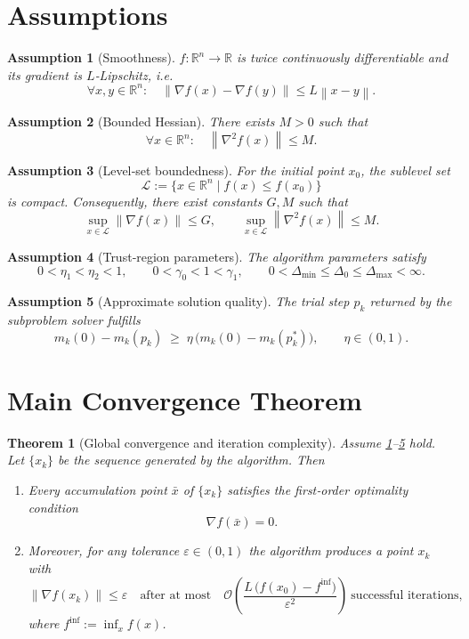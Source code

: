 \documentclass{article}
\newtheorem{theorem}{Theorem}
\newtheorem{assumption}{Assumption}
\newcommand{\norm}[1]{\left\lVert#1\right\rVert}
\newcommand{\RR}{\mathbb{R}}
\begin{document}
\section*{Assumptions}
\begin{assumption}[Smoothness]\label{as:smooth}
$f:\RR^{n}\rightarrow\RR$ is twice continuously differentiable and its gradient is $L$‑Lipschitz, i.e.
\[
\forall x,y\in\RR^{n}:\quad 
\norm{\nabla f(x)-\nabla f(y)}\le L\norm{x-y}.
\tag{A1}
\]
\end{assumption}
\begin{assumption}[Bounded Hessian]\label{as:hessian}
There exists $M>0$ such that
\[
\forall x\in\RR^{n}:\quad 
\norm{\nabla^{2}f(x)}\le M.
\tag{A2}
\]
\end{assumption}
\begin{assumption}[Level‑set boundedness]\label{as:level}
For the initial point $x_{0}$, the sublevel set
\[
\mathcal{L}:=\{x\in\RR^{n}\mid f(x)\le f(x_{0})\}
\]
is compact. Consequently, there exist constants $G,M$ such that
\[
\sup_{x\in\mathcal{L}}\norm{\nabla f(x)}\le G,\qquad
\sup_{x\in\mathcal{L}}\norm{\nabla^{2}f(x)}\le M.
\tag{A3}
\]
\end{assumption}
\begin{assumption}[Trust‑region parameters]\label{as:params}
The algorithm parameters satisfy
\[
0<\eta_{1}<\eta_{2}<1,\qquad
0<\gamma_{0}<1<\gamma_{1},\qquad
0<\Delta_{\min}\le\Delta_{0}\le\Delta_{\max}<\infty .
\tag{A4}
\]
\end{assumption}
\begin{assumption}[Approximate solution quality]\label{as:approx}
The trial step $p_{k}$ returned by the subproblem solver fulfills
\[
m_{k}(0)-m_{k}(p_{k})\;\ge\;\eta\,
\bigl(m_{k}(0)-m_{k}(p_{k}^{*})\bigr),
\qquad \eta\in(0,1).
\tag{A5}
\]
\end{assumption}

\section*{Main Convergence Theorem}
\begin{theorem}[Global convergence and iteration complexity]\label{thm:main}
Assume \ref{as:smooth}–\ref{as:approx} hold. Let $\{x_{k}\}$ be the sequence generated by the algorithm. Then
\begin{enumerate}[label=(\roman*)]
\item Every accumulation point $\bar x$ of $\{x_{k}\}$ satisfies the first‑order optimality condition
\[
\nabla f(\bar x)=0 .
\]
\item Moreover, for any tolerance $\varepsilon\in(0,1)$ the algorithm produces a point $x_{k}$ with
\[
\norm{\nabla f(x_{k})}\le\varepsilon
\quad\text{after at most}\quad
\mathcal{O}\!\left(\frac{L\,\bigl(f(x_{0})-f^{\inf}\bigr)}{\varepsilon^{2}}\right)
\ \text{successful iterations},
\]
where $f^{\inf}:=\inf_{x}f(x)$.
\end{enumerate}
\end{theorem}
\end{document}
